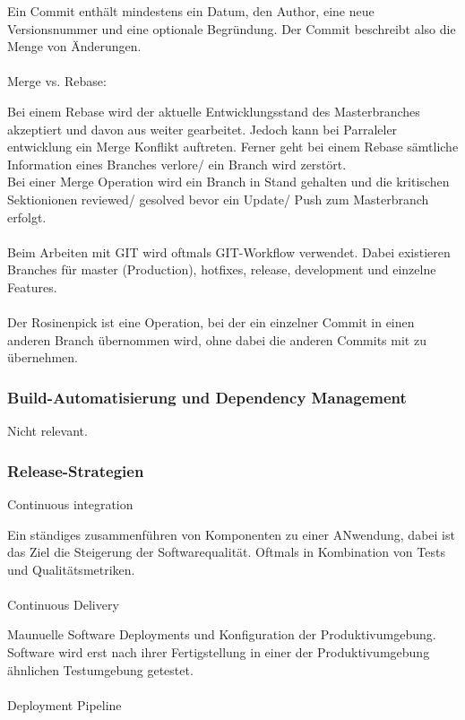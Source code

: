 Ein Commit enthält mindestens ein Datum, den Author, eine neue Versionsnummer und eine optionale Begründung.
Der Commit beschreibt also die Menge von Änderungen.
\\ \\
Merge vs. Rebase:

Bei einem Rebase wird der aktuelle Entwicklungsstand des Masterbranches akzeptiert und davon aus weiter gearbeitet.
Jedoch kann bei Parraleler entwicklung ein Merge Konflikt auftreten.
Ferner geht bei einem Rebase sämtliche Information eines Branches verlore/ ein Branch wird zerstört.
\\
Bei einer Merge Operation wird ein Branch in Stand gehalten und die kritischen Sektionionen reviewed/ gesolved bevor ein
Update/ Push zum Masterbranch erfolgt.
\\ \\
Beim Arbeiten mit GIT wird oftmals GIT-Workflow verwendet.
Dabei existieren Branches für master (Production), hotfixes, release, development und einzelne Features.
\\ \\
Der Rosinenpick ist eine Operation, bei der ein einzelner Commit in einen anderen Branch übernommen wird, ohne dabei die
anderen Commits mit zu übernehmen.

\subsubsection{Build-Automatisierung und Dependency Management}

Nicht relevant.

\subsubsection{Release-Strategien}

Continuous integration

Ein ständiges zusammenführen von Komponenten zu einer ANwendung, dabei ist das Ziel die Steigerung der Softwarequalität.
Oftmals in Kombination von Tests und Qualitätsmetriken.
\\ \\
Continuous Delivery

Maunuelle Software Deployments und Konfiguration der Produktivumgebung.
Software wird erst nach ihrer Fertigstellung in einer der Produktivumgebung ähnlichen Testumgebung getestet.
\\ \\
Deployment Pipeline

